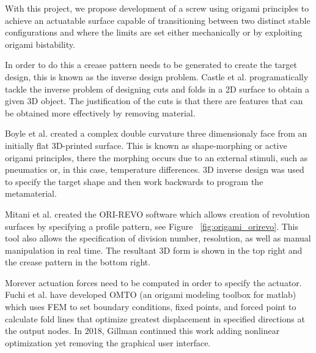 


With this project, we propose development of a screw using origami principles to achieve an actuatable surface capable of transitioning between two distinct stable configurations and where the limits are set either mechanically or by exploiting origami bistability. 

In order to do this a crease pattern needs to be generated to create the target design, this is known as the inverse design problem. Castle et al. \cite{Castle2014} programatically tackle the inverse problem of designing cuts and folds in a 2D surface to obtain a given 3D object. The justification of the cuts is that there are features that can be obtained more effectively by removing material.  


Boyle et al. created a complex double curvature three dimensionaly face from an initially flat 3D-printed surface. This is known as shape-morphing or active origami principles, there the morphing occurs due to an external stimuli, such as pneumatics or, in this case, temperature differences. 3D inverse design was used to specify the target shape and then work backwards to program the metamaterial. 	

Mitani et al. \cite{Mitani2009} created the ORI-REVO software which allows creation of revolution surfaces by specifying a profile pattern, see Figure ~\ref{fig:origami_orirevo}. This tool also allows the specification of division number, resolution, as well as manual manipulation in real time. The resultant 3D form is shown in the top right and the crease pattern in the bottom right. %


Morever actuation forces need to be computed in order to specify the actuator. Fuchi et al. \cite{Fuchi2013} have developed OMTO (an origami modeling toolbox for matlab) which uses FEM to set boundary conditions, fixed points, and forced point to calculate fold lines that optimize greatest displacement in specified directions at the output nodes. In 2018, Gillman \cite{Gillman2018} continued this work adding nonlinear optimization yet removing the graphical user interface. 





